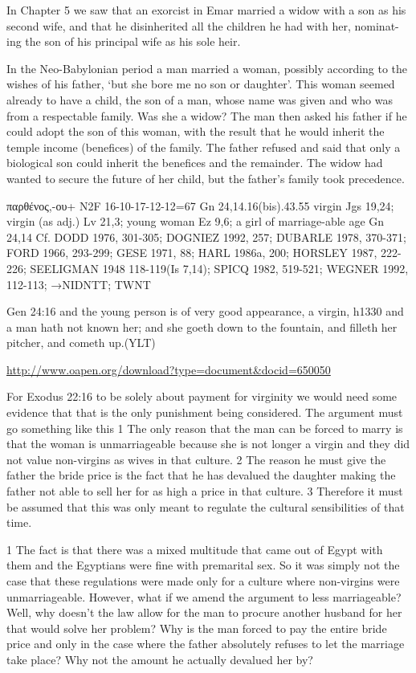 \documentclass[11pt]{article}
\begin{document}
{\begin{thebibliography}{56}
In Chapter 5 we saw that an exorcist in Emar married a widow with a son as his
second wife, and that he disinherited all the children he had with her, nominat-
ing the son of his principal wife as his sole heir.

     In the Neo-Babylonian period a man married a woman, possibly according
to the wishes of his father, `but she bore me no son or daughter'. This woman
seemed already to have a child, the son of a man, whose name was given and
who was from a respectable family. Was she a widow? The man then asked his
father if he could adopt the son of this woman, with the result that he would
inherit the temple income (benefices) of the family. The father refused and said
that only a biological son could inherit the benefices and the remainder. The
widow had wanted to secure the future of her child, but the father's family took
precedence.


παρθένος,-ου+ N2F 16-10-17-12-12=67
Gn 24,14.16(bis).43.55
virgin Jgs 19,24; virgin (as adj.) Lv 21,3; young woman Ez 9,6; a girl of marriage-able age Gn 24,14
Cf. DODD 1976, 301-305; DOGNIEZ 1992, 257; DUBARLE 1978, 370-371; FORD 1966, 293-299; GESE
1971, 88; HARL 1986a, 200; HORSLEY 1987, 222-226; SEELIGMAN 1948 118-119(Is 7,14); SPICQ 1982,
519-521; WEGNER 1992, 112-113; →NIDNTT; TWNT 

Gen 24:16
and the young person is of very good appearance, a virgin, h1330 and a man hath not known her; and she goeth down to the fountain, and filleth her pitcher, and cometh up.(YLT)



\url{http://www.oapen.org/download?type=document&docid=650050}
\end{thebibliography}


For Exodus 22:16 to be solely about payment for virginity we would need some evidence that that is the only punishment being considered. The argument must go something like this 
1 The only reason that the man can be forced to marry is that the woman is unmarriageable because she is not longer a virgin and they did not value non-virgins as wives in that culture.
2 The reason he must give the father the bride price is the fact that he has devalued the daughter making the father not able to sell her for as high a price in that culture. 
3 Therefore it must be assumed that this was only meant to regulate the cultural sensibilities of that time.  

1 The fact is that there was a mixed multitude that came out of Egypt with them and the Egyptians were fine with premarital sex. So it was simply not the case that these regulations were made only for a culture where non-virgins were unmarriageable. However, what if we amend the argument to less marriageable? Well, why doesn't the law allow for the man to procure another husband for her that would solve her problem? Why is the man forced to pay the entire bride price and only in the case where the father absolutely refuses to let the marriage take place? Why not the amount he actually devalued her by?

}
\end{document}
